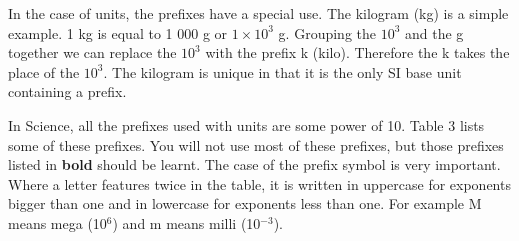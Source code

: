       \label{m30853*id65253}In the case of units, the prefixes have a special use. The kilogram (kg) is a simple example. 1 kg is equal to 1 000 g or \begin{math}1\ensuremath{\times}{10}^{3}\end{math} g. Grouping the \begin{math}{10}^{3}\end{math} and the g together we can replace the \begin{math}{10}^{3}\end{math} with the prefix k (kilo). Therefore the k takes the place of the \begin{math}{10}^{3}\end{math}.
The kilogram is unique in that it is the only SI base unit containing a prefix.\par 
      \label{m30853*id65322}In Science, all the prefixes used with units are some power of 10. Table 3 lists some of these prefixes. You will not use most of these prefixes, but those prefixes listed in \textbf{bold} should be learnt. The case of the prefix symbol is very important. Where a letter features twice in the table, it is written in uppercase for exponents bigger than one and in lowercase for exponents less than one. For example M means mega (10\begin{math}{}^{6}\end{math}) and m means milli (10\begin{math}{}^{-3}\end{math}).\par 
      
    
      
